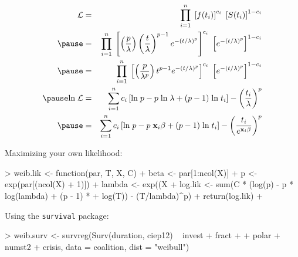\documentclass{beamer}
\begin{document}
\begin{frame}
\begin{eqnarray*}
\mathcal{L} &=& \prod^n_{i=1} \; \left[ f(t_i) \right] ^
{c_i} \; \left[ S(t_i) \right] ^ {1 - c_i} \\  
\pause 
&=&  \prod^n_{i=1} \; \left[  \left( \frac{p}{\lambda} \right) \left( \frac{t}{\lambda}
\right) ^ {p-1} e^{-(t/\lambda)^p} \right] ^
{c_i} \; \left[ e^{-(t/\lambda)^p} \right] ^ {1 - c_i} \\  
\pause
&=&  \prod^n_{i=1} \; \left[  \left( \frac{p}{\lambda ^p} \right) t^{p-1} e^{-(t/\lambda)^p} \right] ^{c_i} \; \left[ e^{-(t/\lambda)^p} \right] ^ {1 - c_i} \\  
\pause
\mathrm{ln} \; \mathcal{L} &=& \sum_{i=1}^n c_i \left[ \mathrm{ln} \;
p - p \; \mathrm{ln} \; \lambda + (p-1) \; \mathrm{ln} \; t_i \right] - \left(
\frac{t_i}{\lambda} \right) ^p\\
\pause
&=& \sum_{i=1}^n c_i \left[ \mathrm{ln} \;
p - p \; \mathbf{x}_i \beta + (p-1) \; \mathrm{ln} \; t_i \right] - \left(
\frac{t_i}{ e^{\mathbf{x}_i \beta}} \right) ^p\\
\end{eqnarray*}
\end{frame}

\begin{frame}[fragile]
Maximizing your own likelihood:
\pause
\tiny
\begin{Schunk}
\begin{Sinput}
> weib.lik <- function(par, T, X, C) {
+     beta <- par[1:ncol(X)]
+     p <- exp(par[(ncol(X) + 1)])
+     lambda <- exp((X %
+     log.lik <- sum(C * (log(p) - p * log(lambda) + (p - 1) * 
+         log(T)) - (T/lambda)^p)
+     return(log.lik)
+ }
\end{Sinput}
\end{Schunk}
\pause
\begin{Schunk}
\end{Schunk}
\pause
\normalsize
\bigskip
Using the {\tt survival} package:
\tiny
\begin{Schunk}
\begin{Sinput}
> weib.surv <- survreg(Surv(duration, ciep12) ~ invest + fract + 
+     polar + numst2 + crisis, data = coalition, dist = "weibull")
\end{Sinput}
\end{Schunk}
\end{frame}
\end{document}
